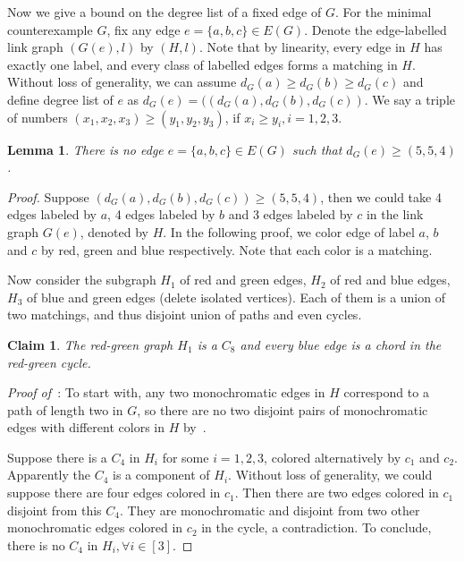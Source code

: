 \documentclass[a4paper]{article}
\newtheorem{lem}[thm]{Lemma}
\newtheorem{clm}[thm]{Claim}
\begin{document}
Now we give a bound on the degree list of a fixed edge of $G$.
For the minimal counterexample $G$, fix any edge $e=\{a,b,c\}\in E (G)$. Denote the edge-labelled link graph $(G(e),l)$ by $(H,l)$. Note that by linearity, every edge in $H$ has exactly one label, and every class of labelled edges forms a matching in $H$. Without loss of generality, we can assume $d_G(a)\geq d_G(b)\geq d_G(c)$ and define degree list of $e$ as $d_G(e) = ((d_G(a),d_G(b),d_G(c))$. We say a triple of numbers $(x_1,x_2,x_3)\geq (y_1,y_2,y_3)$, if $x_i\geq y_i,i=1,2,3$.



\begin{lem}\label{degreelist}
    There is no edge $e = \{a,b,c\}\in E (G)$ such that $d_G(e)\geq (5,5,4)$.
\end{lem}
\begin{proof}
Suppose $(d_G(a),d_G(b),d_G(c))\geq (5,5,4)$, then we could take 4 edges labeled by $a$, 4 edges labeled by $b$ and 3 edges labeled by $c$ in the link graph $G(e)$, denoted by $H$. In the following proof, we color edge of label $a$, $b$ and $c$ by red, green and blue respectively. Note that each color is a matching.

Now consider the subgraph $H_1$ of red and green edges, $H_2$ of red and blue edges, $H_3$ of blue and green edges (delete isolated vertices). Each of them is a union of two matchings, and thus disjoint union of paths and even cycles.


\begin{clm}\label{H123}
   The red-green graph $H_1$ is a $C_8$ and every blue edge is a chord in the red-green cycle.
\end{clm}
\textit{Proof of~}: 
To start with, any two monochromatic edges in $H$ correspond to a path of length two in $G$, so there are no two disjoint pairs of monochromatic edges with different colors in $H$ by~. 

Suppose there is a $C_4$ in $H_i$ for some $i=1,2,3$, colored alternatively by $c_1$ and $c_2$. Apparently the $C_4$ is a component of $H_i$. Without loss of generality, we could suppose there are four edges colored in $c_1$. Then there are two edges colored in $c_1$ disjoint from this $C_4$. They are monochromatic and disjoint from two other monochromatic edges colored in $c_2$ in the cycle, a contradiction. To conclude, there is no $C_4$ in $H_i,\forall i\in[3]$.


\end{proof}
\end{document}
